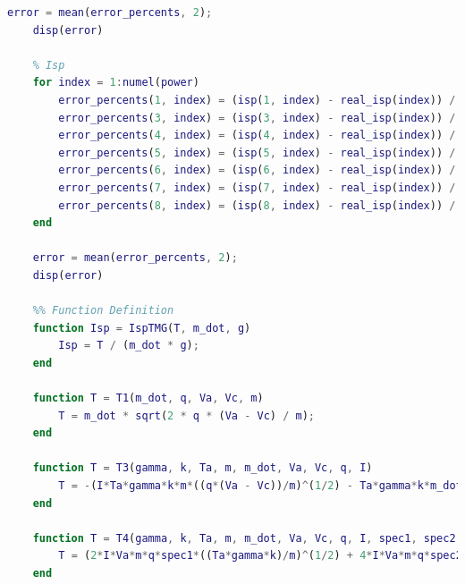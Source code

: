 \documentclass[letterpaper, 10 pt, conference]{ieeeconf}  %
\begin{document}
\begin{lstlisting}[language=Matlab]
    error = mean(error_percents, 2);
    disp(error)
    
    % Isp
    for index = 1:numel(power)
        error_percents(1, index) = (isp(1, index) - real_isp(index)) / real_isp(index) * 100.0;
        error_percents(3, index) = (isp(3, index) - real_isp(index)) / real_isp(index) * 100.0;
        error_percents(4, index) = (isp(4, index) - real_isp(index)) / real_isp(index) * 100.0;
        error_percents(5, index) = (isp(5, index) - real_isp(index)) / real_isp(index) * 100.0;
        error_percents(6, index) = (isp(6, index) - real_isp(index)) / real_isp(index) * 100.0;
        error_percents(7, index) = (isp(7, index) - real_isp(index)) / real_isp(index) * 100.0;
        error_percents(8, index) = (isp(8, index) - real_isp(index)) / real_isp(index) * 100.0;
    end
    
    error = mean(error_percents, 2);
    disp(error)
    
    %% Function Definition
    function Isp = IspTMG(T, m_dot, g)
        Isp = T / (m_dot * g);
    end
    
    function T = T1(m_dot, q, Va, Vc, m)
        T = m_dot * sqrt(2 * q * (Va - Vc) / m);
    end
    
    function T = T3(gamma, k, Ta, m, m_dot, Va, Vc, q, I)
        T = -(I*Ta*gamma*k*m*((q*(Va - Vc))/m)^(1/2) - Ta*gamma*k*m_dot*q*((q*(Va - Vc))/m)^(1/2) - 2^(1/2)*I*Va*m*q*((Ta*gamma*k)/m)^(1/2) + 2^(1/2)*I*Vc*m*q*((Ta*gamma*k)/m)^(1/2))/(m*q*((q*(Va - Vc))/m)^(1/2)*((Ta*gamma*k)/m)^(1/2));
    end
    
    function T = T4(gamma, k, Ta, m, m_dot, Va, Vc, q, I, spec1, spec2, spec3)
        T = (2*I*Va*m*q*spec1*((Ta*gamma*k)/m)^(1/2) + 4*I*Va*m*q*spec2*((Ta*gamma*k)/m)^(1/2) + 6*I*Va*m*q*spec3*((Ta*gamma*k)/m)^(1/2) - 2*I*Vc*m*q*spec1*((Ta*gamma*k)/m)^(1/2) - 4*I*Vc*m*q*spec2*((Ta*gamma*k)/m)^(1/2) - 6*I*Vc*m*q*spec3*((Ta*gamma*k)/m)^(1/2) - 2*I*Ta*gamma*k*m*spec2*((q*(Va - Vc))/m)^(1/2) + 4*Ta*gamma*k*m_dot*q*spec2*((q*(Va - Vc))/m)^(1/2) - 2^(1/2)*I*Ta*gamma*k*m*spec1*((q*(Va - Vc))/m)^(1/2) - 6^(1/2)*I*Ta*gamma*k*m*spec3*((q*(Va - Vc))/m)^(1/2) + 2^(1/2)*Ta*gamma*k*m_dot*q*spec1*((q*(Va - Vc))/m)^(1/2) + 3*6^(1/2)*Ta*gamma*k*m_dot*q*spec3*((q*(Va - Vc))/m)^(1/2))/(m*q*((q*(Va - Vc))/m)^(1/2)*(4*spec2 + 2^(1/2)*spec1 + 3*6^(1/2)*spec3)*((Ta*gamma*k)/m)^(1/2));
    end
    

\end{lstlisting}
\end{document}
